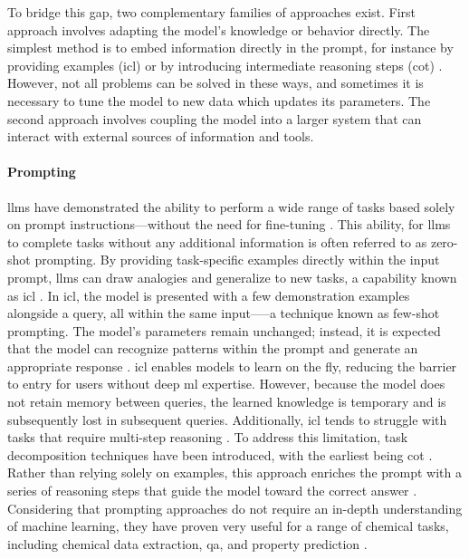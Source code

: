 To bridge this gap, two complementary families of approaches exist. First approach involves adapting the model's knowledge or behavior directly. The simplest method is to embed information directly in the prompt, for instance by providing examples (\gls{icl}) \autocite{brown2020language} or by introducing intermediate reasoning steps (\gls{cot}) \autocite{wei2022chain}. However, not all problems can be solved in these ways, and sometimes it is necessary to tune the model to new data which updates its parameters. 
The second approach involves coupling the model into a larger system that can interact with external sources of information and tools.







\paragraph{Prompting}\label{sec:prompting} \glspl{llm} have demonstrated the ability to perform a wide range of tasks based solely on prompt instructions---without the need for fine-tuning \autocite{radford2019language}. 
This ability, for \glspl{llm} to complete tasks without any additional information is often referred to as zero-shot prompting.
By providing task-specific examples directly within the input prompt, \glspl{llm} can draw analogies and generalize to new tasks, a capability known as \gls{icl} \autocite{brown2020language, chowdhery2023palm, openai2023gpt04}. 
In \gls{icl}, the model is presented with a few demonstration examples alongside a query, all within the same input—--a technique known as few-shot prompting. 
The model's parameters remain unchanged; instead, it is expected that the model can recognize patterns within the prompt and generate an appropriate response \cite{von2023transformers}. \gls{icl} enables models to learn on the fly, reducing the barrier to entry for users without deep \gls{ml} expertise. 
However, because the model does not retain memory between queries, the learned knowledge is temporary and is subsequently lost in subsequent queries. 
Additionally, \gls{icl} tends to struggle with tasks that require multi-step reasoning \autocite{brown2020language}. 
To address this limitation, task decomposition techniques have been introduced, with the earliest being \gls{cot} \autocite{wei2022chain}. 
Rather than relying solely on examples, this approach enriches the prompt with a series of reasoning steps that guide the model toward the correct answer \autocite{wei2022chain}. 
Considering that prompting approaches do not require an in-depth understanding of machine learning, they have proven very useful for a range of chemical tasks, including chemical data extraction, \gls{qa}, and property prediction \autocite{liu2025integrating, zheng2023chatgpt, mirza2024large}.


